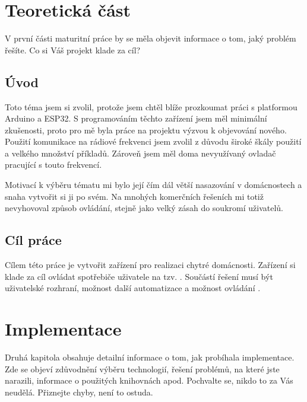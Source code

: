 \documentclass[11pt,a4paper,twoside,openright]{report}
\begin{document}


\setcounter{tocdepth}{2}
\tableofcontents

\chapter{Teoretická část}
\pagestyle{fancy}

V první části maturitní práce by se měla objevit informace o tom, jaký problém řešíte. Co si Váš projekt klade za cíl?

\section{Úvod}

Toto téma jsem si zvolil, protože jsem chtěl blíže prozkoumat práci s platformou Arduino a ESP32. S programováním těchto zařízení jsem měl minimální zkušenosti, proto pro mě byla práce na projektu výzvou k objevování nového. Použití komunikace na rádiové frekvenci jsem zvolil z důvodu široké škály použití a velkého množství příkladů. Zároveň jsem měl doma nevyužívaný ovladač pracující s touto frekvencí.



Motivací k výběru tématu  mi bylo její čím dál větší nasazování v domácnostech a snaha vytvořit si ji po svém. Na mnohých komerčních řešeních mi totiž nevyhovoval způsob ovládání, stejně jako velký zásah do soukromí uživatelů.


\section{Cíl práce}

Cílem této práce je vytvořit zařízení pro realizaci chytré domácnosti. Zařízení si klade za cíl ovládat spotřebiče uživatele na tzv. . Součástí řešení musí být uživatelské rozhraní, možnost další automatizace a možnost ovládání .


\chapter{Implementace}

Druhá kapitola obsahuje detailní informace o tom, jak probíhala implementace. Zde se objeví zdůvodnění výběru technologií, řešení problémů, na které jste narazili, informace o použitých knihovnách apod. Pochvalte se, nikdo to za Vás neudělá. Přiznejte chyby, není to ostuda.
\end{document}
